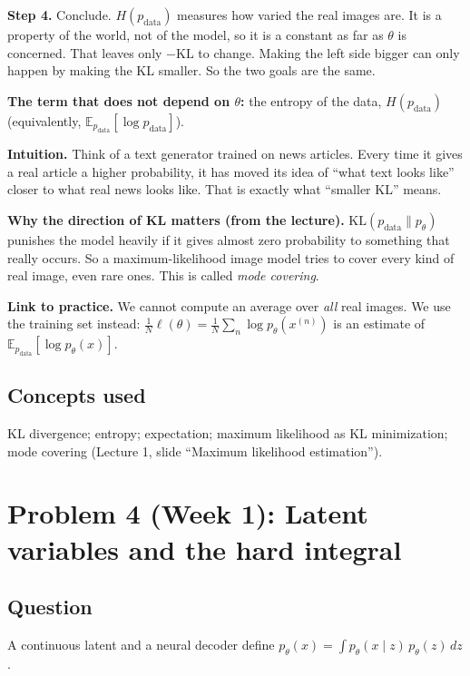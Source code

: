 \documentclass[12pt,a4paper]{article}
\begin{document}
\textbf{Step 4.} Conclude. $H(p_{\text{data}})$ measures how varied the real images are. It is a property of the world, not of the model, so it is a constant as far as $\theta$ is concerned. That leaves only $-\mathrm{KL}$ to change. Making the left side bigger can only happen by making the KL smaller. So the two goals are the same.

\textbf{The term that does not depend on $\theta$:} the entropy of the data, $H(p_{\text{data}})$ (equivalently, $\mathbb{E}_{p_{\text{data}}}[\log p_{\text{data}}]$).

\textbf{Intuition.} Think of a text generator trained on news articles. Every time it gives a real article a higher probability, it has moved its idea of ``what text looks like'' closer to what real news looks like. That is exactly what ``smaller KL'' means.

\textbf{Why the direction of KL matters (from the lecture).} $\mathrm{KL}(p_{\text{data}}\|p_\theta)$ punishes the model heavily if it gives almost zero probability to something that really occurs. So a maximum-likelihood image model tries to cover every kind of real image, even rare ones. This is called \emph{mode covering}.

\textbf{Link to practice.} We cannot compute an average over \emph{all} real images. We use the training set instead: $\frac{1}{N}\ell(\theta) = \frac{1}{N}\sum_n \log p_\theta(x^{(n)})$ is an estimate of $\mathbb{E}_{p_{\text{data}}}[\log p_\theta(x)]$.

\subsection{Concepts used}

KL divergence; entropy; expectation; maximum likelihood as KL minimization; mode covering (Lecture 1, slide ``Maximum likelihood estimation'').

\section{Problem 4 (Week 1): Latent variables and the hard integral}

\subsection{Question}

A continuous latent and a neural decoder define $p_\theta(x) = \int p_\theta(x \mid z)\, p_\theta(z)\, dz$.
\end{document}
